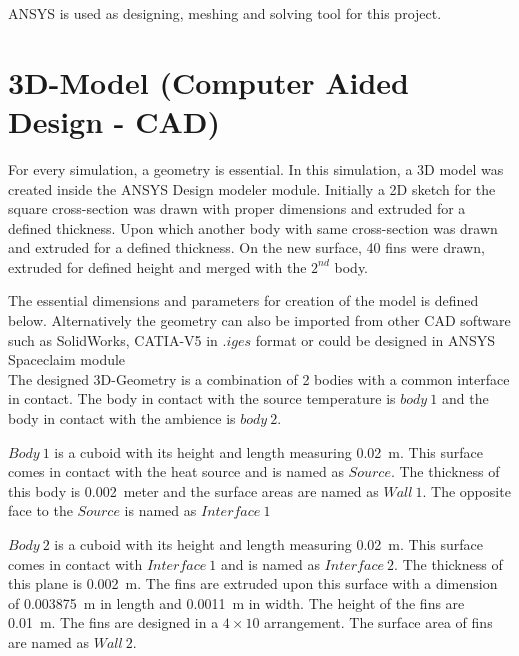 \documentclass{article}
\begin{document}
ANSYS is used as designing, meshing and solving tool for this project. 

\section{3D-Model (Computer Aided Design - CAD)}
For every simulation, a geometry is essential. In this simulation, a 3D model was created inside the ANSYS Design modeler module. 
Initially a 2D sketch for the square cross-section was drawn with proper dimensions and extruded for a defined thickness. Upon which another body with same cross-section was drawn and extruded for a defined thickness. On the new surface, 40 fins were drawn, extruded for defined height and merged with the $2^{nd}$ body.

The essential dimensions and parameters for creation of the model is defined below. Alternatively the geometry can also be imported from other CAD software such as SolidWorks, CATIA-V5 in $.iges$ format or could be designed in ANSYS Spaceclaim module\\
The designed 3D-Geometry is a combination of 2 bodies with a common interface in contact. The body in contact with the source temperature is $body\ 1$ and the body in contact with the ambience is $body\ 2$. 

$Body\ 1$ is a cuboid with its height and length measuring \SI{0.02}{\meter}. This surface comes in contact with the heat source and is named as $Source$. The thickness of this body is \SI{0.002}{meter} and the surface areas are named as $Wall\ 1$. The opposite face to the $Source$ is named as $Interface\ 1$

$Body\ 2$ is a cuboid with its height and length measuring \SI{0.02}{\meter}. This surface comes in contact with $Interface\ 1$ and is named as $Interface\ 2$. The thickness of this plane is \SI{0.002}{m}. The fins are extruded upon this surface with a dimension of \SI{0.003875}{\meter} in length and \SI{0.0011}{\meter} in width. The height of the fins are \SI{0.01}{\meter}. The fins are designed in a $4 \times 10$ arrangement. The surface area of fins are named as $Wall\ 2$. 
\end{document}

